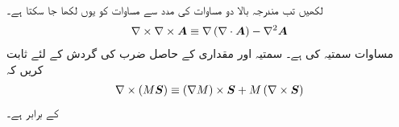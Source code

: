 لکھیں تب مندرجہ بالا دو مساوات کی مدد سے مساوات  کو یوں لکھا جا سکتا ہے۔
\begin{align}\label{مساوات_مقناطیسی_گردش_کی_گردش_ب}
\nabla \times \nabla \times {\ensuremath{{\boldsymbol{A}}}} \equiv \nabla \left(\nabla \cdot {\ensuremath{{\boldsymbol{A}}}} \right)-\nabla^2 {{\boldsymbol{A}}}
\end{align}
مساوات  سمتیہ کی  ہے۔
سمتیہ  اور مقداری  کے حاصل ضرب کی گردش کے لئے ثابت کریں کہ
\begin{align}
\nabla \times \left(M{{\boldsymbol{S}}}\right) \equiv \left(\nabla M\right) \times {\ensuremath{{\boldsymbol{S}}}}+M \left(\nabla \times {\ensuremath{{\boldsymbol{S}}}}\right)
\end{align}
کے برابر ہے۔

